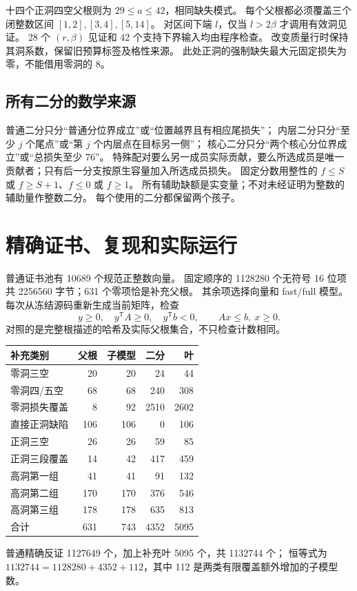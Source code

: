 \documentclass[11pt,a4paper]{article}
\theoremstyle{definition}
\begin{document}
十四个正洞四空父根则为 $29\le a\le42$，相同缺失模式。
每个父根都必须覆盖三个闭整数区间 $[1,2],[3,4],[5,14]$。
对区间下端 $l$，仅当 $l>2\beta$ 才调用有效洞见证。
28 个 $(r,\beta)$ 见证和 42 个支持下界输入均由程序检查。
改变质量行时保持其洞系数，保留旧预算标签及格性来源。
此处正洞的强制缺失最大元固定损失为零，不能借用零洞的 8。

\subsection{所有二分的数学来源}
普通二分只分“普通分位界成立”或“位置越界且有相应尾损失”；
内层二分只分“至少 $j$ 个尾点”或“第 $j$ 个内层点在目标另一侧”；
核心二分只分“两个核心分位界成立”或“总损失至少 76”。
特殊配对要么另一成员实际贡献，要么所选成员是唯一贡献者；只有后一分支按原生容量加入所选成员损失。
固定分数用整性的 $f\le S$ 或 $f\ge S+1$、$f\le0$ 或 $f\ge1$。
所有辅助缺额是实变量；不对未经证明为整数的辅助量作整数二分。
每个使用的二分都保留两个孩子。

\section{精确证书、复现和实际运行}\label{verification}
普通证书池有 10689 个规范正整数向量。
固定顺序的 1128280 个无符号 16 位项共 2256560 字节；631 个零项恰是补充父根。
其余项选择向量和 fast/full 模型。每次从冻结源码重新生成当前矩阵，检查
\[
 y\ge0,\quad y^{\mathsf T}A\ge0,\quad y^{\mathsf T}b<0,
 \qquad Ax\le b,\ x\ge0.
\]
对照的是完整根描述的哈希及实际父根集合，不只检查计数相同。
\begin{center}\small\begin{tabular}{lrrrr}\toprule
补充类别&父根&子模型&二分&叶\\\midrule
零洞三空&20&20&24&44\\
零洞四/五空&68&68&240&308\\
零洞损失覆盖&8&92&2510&2602\\
直接正洞缺陷&106&106&0&106\\
正洞三空&26&26&59&85\\
正洞三段覆盖&14&42&417&459\\
高洞第一组&41&41&91&132\\
高洞第二组&170&170&376&546\\
高洞第三组&178&178&635&813\\\midrule
合计&631&743&4352&5095\\\bottomrule
\end{tabular}\end{center}
普通精确反证 1127649 个，加上补充叶 5095 个，共 1132744 个；
恒等式为 $1132744=1128280+4352+112$，其中 112 是两类有限覆盖额外增加的子模型数。
\end{document}
